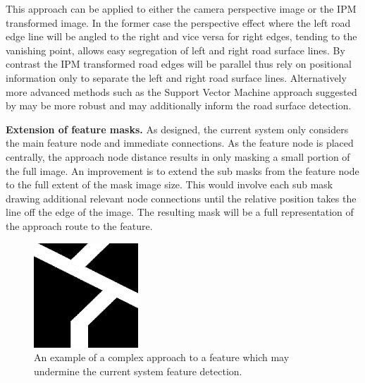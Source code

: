 \documentclass[]{aiaa-tc}%
\begin{document}
This approach can be applied to either the camera perspective image or the IPM transformed image. In the former case the perspective effect where the left road edge line will be angled to the right and vice versa for right edges, tending to the vanishing point, allows easy segregation of left and right road surface lines. By contrast the IPM transformed road edges will be parallel thus rely on positional information only to separate the left and right road surface lines. Alternatively more advanced methods such as the Support Vector Machine approach suggested by \citet{moncularLaneDetectAndTrack} may be more robust and may additionally inform the road surface detection.



\textbf{Extension of feature masks.} As designed, the current system only considers the main feature node and immediate connections. As the feature node is placed centrally, the approach node distance results in only masking a small portion of the full image. An improvement is to extend the sub masks from the feature node to the full extent of the mask image size. This would involve each sub mask drawing additional relevant node connections until the relative position takes the line off the edge of the image. The resulting mask will be a full representation of the approach route to the feature.

\begin{figure} %
	\centering
	\includegraphics[width=0.35\textwidth]{complexFeatureApproach.png}
	\caption{An example of a complex approach to a feature which may undermine the current system feature detection.}
	\label{f:complexFeatureApproach}
\end{figure}
\end{document}
